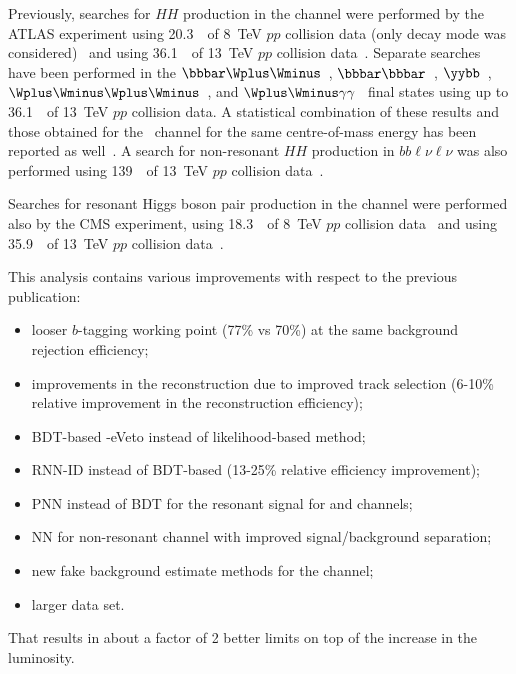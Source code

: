 Previously, searches for $HH$ production in the \bbtt channel were performed by the ATLAS experiment using 20.3~\ifb\ of
8~TeV $pp$ collision data (only \lephad decay mode was considered)~\cite{HIGG-2013-33} and using 36.1~\ifb\ of 13~TeV $pp$ collision data~\cite{HIGG-2016-16}. Separate searches have been performed in the $\bbbar\Wplus\Wminus$~\cite{HIGG-2016-27},
$\bbbar\bbbar$~\cite{EXOT-2016-31}, $\yybb$~\cite{HIGG-2016-15}, $\Wplus\Wminus\Wplus\Wminus$~\cite{HIGG-2016-24}, 
and $\Wplus\Wminus\gamma\gamma$~\cite{HIGG-2016-20} final states using up to 36.1~\ifb\ of 13~TeV $pp$ collision data. A statistical combination of these results and those obtained for the \bbtt\ channel for the same centre-of-mass energy has been reported as well~\cite{HDBS-2018-58}. A search for non-resonant $HH$ production in $bb\ell\nu\ell\nu$ was also performed using 139~\ifb\ of 13~TeV $pp$ collision data~\cite{Aad_2020}.

Searches for resonant Higgs boson pair production in the \bbtt channel were performed also by the CMS experiment, using 18.3~\ifb\ of 8~TeV $pp$ collision data~\cite{PhysRevD.96.072004} and using 35.9~\ifb\ of 13~TeV $pp$ collision data~\cite{Sirunyan:2017djm}.

This analysis contains various improvements with respect to the previous publication:
\begin{itemize}
\item looser $b$-tagging working point (77\% vs 70\%) at the same background rejection efficiency;
\item improvements in the \tauhad reconstruction due to improved track selection (6-10\% relative improvement in the reconstruction efficiency);
\item BDT-based \tauhad-eVeto instead of likelihood-based method;
\item RNN-\tauhad ID instead of BDT-based (13-25\% relative efficiency improvement);
\item PNN instead of BDT for the resonant signal for \lephad and \hadhad channels;
\item NN for \lephad non-resonant channel with improved signal/background separation;
\item new fake background estimate methods for the \hadhad channel;
\item larger data set.
\end{itemize}
That results in about a factor of 2 better limits on top of the increase in the luminosity.